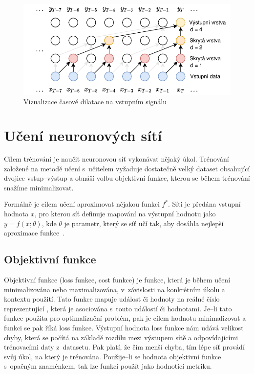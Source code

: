\begin{figure}[H]
    \centering
    \includegraphics[scale=1.1]{obrazky-figures/causal_dilation.pdf}
    \caption{\label{fig:dilation_factor}Vizualizace časové dilatace na vstupním signálu}
\end{figure}


\section{Učení neuronových sítí}
Cílem trénování je naučit neuronovou síť vykonávat nějaký úkol. Trénování založené na metodě učení s~učitelem vyžaduje dostatečně velký dataset obsahující dvojice vstup--výstup a obnáší volbu objektivní funkce, kterou se během trénování snažíme minimalizovat. 

Formálně je cílem učení aproximovat nějakou funkci $f^\ast$. Síti je předána vstupní hodnota $x$, pro kterou síť definuje mapování na výstupní hodnotu jako $y = f(x; \theta)$, kde $\theta$ je parametr, který se síť učí tak, aby dosáhla nejlepší aproximace funkce~\cite{mitdeeplearning}.


\subsection{Objektivní funkce}
Objektivní funkce (loss funkce, cost funkce) je funkce, která je během učení minimalizována nebo maximalizována, v~závislosti na konkrétním úkolu a kontextu použití. Tato funkce mapuje událost či hodnoty na reálné číslo reprezentující , která je asociována s~touto událostí či hodnotami. Je--li tato funkce použita pro optimalizační problém, pak je cílem hodnotu minimalizovat a funkci se pak říká loss funkce. Výstupní hodnota loss funkce nám udává velikost chyby, která se počítá na základě rozdílu mezi výstupem sítě a odpovídajícími trénovacími daty z~datasetu. Pak platí, že čím menší chyba, tím lépe síť provádí svůj úkol, na který je trénována. Použije--li se hodnota objektivní funkce s~opačným znaménkem, tak lze funkci použít jako hodnotící metriku.


